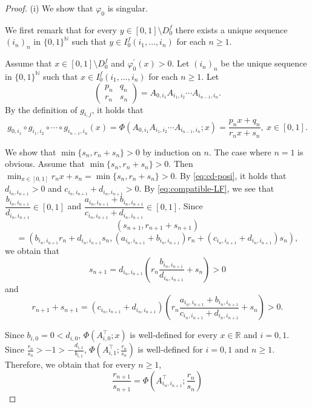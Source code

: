\documentclass[10pt,a4paper]{amsart}
\begin{document}
\begin{proof}
(i) We show that $\varphi_0$ is singular. 

We first remark that  for every $y\in [0,1] \setminus D^{f}_0$ there exists a unique sequence $(i_n)_n$ in $\{0,1\}^{\mathbb N}$ such that $y \in I^{f}_{0} (i_1, \dots, i_n)$ for each $n \ge 1$. 

Assume that $x\in [0,1] \setminus D^{f}_0$ and $\varphi_0^{\prime}(x) > 0$.
Let $(i_n)_n$ be the unique sequence in $\{0,1\}^{\mathbb N}$ such that $x \in I^{f}_{0} (i_1, \dots, i_n)$ for each $n \ge 1$. 
Let 
\[ \begin{pmatrix} p_n & q_n \\  r_n & s_n \end{pmatrix} = A_{0,i_1} A_{i_1, i_2} \cdots A_{i_{n-1}, i_n}. \]
By the definition of $g_{i,j}$, it holds that 
\[ g_{0, i_1} \circ g_{i_1, i_2} \circ \cdots \circ g_{i_{n-1}, i_n} (x) = \Phi \left(A_{0,i_1} A_{i_1, i_2} \cdots A_{i_{n-1}, i_n}; x\right) = \frac{p_n x + q_n}{r_n x + s_n}, \ x \in [0,1]. \]

We show that $\min\{s_n, r_n + s_n\} > 0$ by induction on $n$. 
The case where $n=1$ is obvious. 
Assume that $\min\{s_n, r_n + s_n\} > 0$. 
Then $\displaystyle \min_{x \in [0,1]} r_n x + s_n = \min\{s_n, r_n + s_n\} > 0$. 
By \eqref{eq:cd-posi}, it holds that $d_{i_n, i_{n+1}} > 0$ and $c_{i_n, i_{n+1}} + d_{i_n, i_{n+1}} > 0$. 
By \eqref{eq:compatible-LF}, we see that 
$ \dfrac{b_{i_n, i_{n+1}}}{d_{i_n, i_{n+1}}} \in [0,1]$ and $\dfrac{a_{i_n, i_{n+1}} + b_{i_n, i_{n+1}}}{c_{i_n, i_{n+1}} + d_{i_n, i_{n+1}}}  \in [0,1]$. 
Since 
\[ (s_{n+1}, r_{n+1} + s_{n+1}) \]
\begin{equation}\label{eq:rs-iteration} 
 = \left(b_{i_n, i_{n+1}} r_{n} + d_{i_n, i_{n+1}} s_n,  (a_{i_n, i_{n+1}} + b_{i_n, i_{n+1}}) r_{n} + (c_{i_n, i_{n+1}} + d_{i_n, i_{n+1}}) s_n \right), 
\end{equation}
we obtain that 
\[ s_{n+1} = d_{i_n, i_{n+1}} \left(r_n \frac{b_{i_n, i_{n+1}}}{d_{i_n, i_{n+1}}} + s_n \right) > 0 \]
and 
\[ r_{n+1} + s_{n+1} = (c_{i_n, i_{n+1}} + d_{i_n, i_{n+1}}) \left(r_n \frac{a_{i_n, i_{n+1}} + b_{i_n, i_{n+1}}}{c_{i_n, i_{n+1}} + d_{i_n, i_{n+1}}} + s_n \right) > 0. \]

Since $b_{i,0} = 0 < d_{i,0}$, $ \Phi \left(A_{i, 0}^{\top} ; x\right)$ is well-defined for every $x \in \mathbb{R}$ and $i=0,1$. 
Since $\frac{r_n}{s_n} > -1 > -\frac{d_{i,1}}{b_{i,1}}$, $ \Phi \left(A_{i, 1}^{\top}; \frac{r_n}{s_n}\right)$ is well-defined for $i=0,1$ and $n \ge 1$. 
Therefore, we obtain that for every $n \ge 1$, 
\begin{equation}\label{eq:r-over-s} 
\frac{r_{n+1}}{s_{n+1}} = \Phi \left(A_{i_n, i_{n+1}}^{\top} ; \frac{r_n}{s_n} \right)
\end{equation}


\end{proof}
\end{document}
